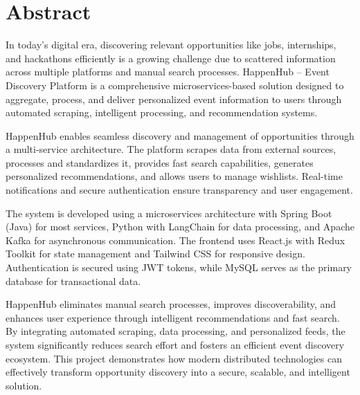 \documentclass[12pt,a4paper]{report}
\begin{document}
\chapter*{Abstract}
\noindent
In today's digital era, discovering relevant opportunities like jobs, internships, and hackathons efficiently is a growing challenge due to scattered information across multiple platforms and manual search processes. HappenHub – Event Discovery Platform is a comprehensive microservices-based solution designed to aggregate, process, and deliver personalized event information to users through automated scraping, intelligent processing, and recommendation systems.

HappenHub enables seamless discovery and management of opportunities through a
multi-service architecture. The platform scrapes data from external sources,
processes and standardizes it, provides fast search capabilities, generates
personalized recommendations, and allows users to manage wishlists. Real-time
notifications and secure authentication ensure transparency and user
engagement.

The system is developed using a microservices architecture with
Spring Boot (Java) for most services, Python with LangChain
for data processing, and Apache Kafka for asynchronous communication.
The frontend uses React.js with Redux Toolkit for state management and
Tailwind CSS for responsive design. Authentication is secured using
JWT tokens, while MySQL serves as the primary database for
transactional data.

HappenHub eliminates manual search processes, improves discoverability, and
enhances user experience through intelligent recommendations and fast search.
By integrating automated scraping, data processing, and personalized feeds, the
system significantly reduces search effort and fosters an efficient event
discovery ecosystem. This project demonstrates how modern distributed
technologies can effectively transform opportunity discovery into a secure,
scalable, and intelligent solution.

\clearpage

\tableofcontents
\clearpage

\listoffigures
{}
\clearpage

\clearpage

\end{document}

